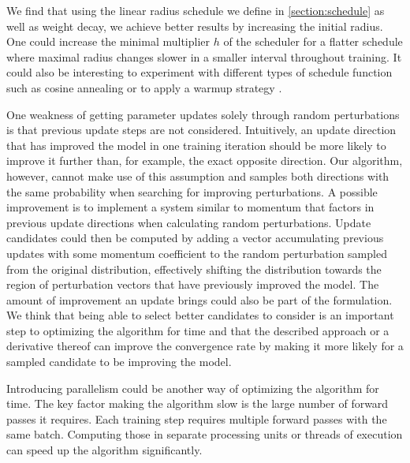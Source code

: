 We find that using the linear radius schedule we define in
\autoref{section:schedule} as well as weight decay, 
we achieve better results 
by increasing the initial radius. 
One could increase the minimal
multiplier $h$ of the scheduler for a flatter schedule where maximal
radius changes slower in a smaller interval 
throughout training. It could also be interesting to 
experiment 
with different types of schedule function such as cosine 
annealing \parencite{cosine} or to apply a warmup 
strategy \parencite{warmup}. 

One weakness of getting parameter updates 
solely through random perturbations is that 
previous update steps are not considered. 
Intuitively, an update direction that 
has improved the model in one training iteration 
should be more likely to improve it further 
than, for example, the exact opposite direction. 
Our algorithm, however, cannot
make use of this assumption and samples both 
directions with the same probability when searching for 
improving perturbations. 
A possible improvement is to implement a
system similar to momentum that factors in previous 
update directions when calculating random 
perturbations. 
Update candidates could then be computed by adding
a vector accumulating previous updates with some 
momentum coefficient to the random perturbation 
sampled from the original distribution, effectively
shifting the distribution towards the region of 
perturbation vectors that have 
previously improved the model. 
The amount of improvement an update brings could 
also be part of the formulation. We think that 
being able to select better candidates to consider
is an important step to optimizing the algorithm for time  
and that the described approach or a derivative thereof
can improve the convergence 
rate by making it more likely 
for a sampled candidate to be improving the model.

Introducing parallelism could be another way of 
optimizing the algorithm for time. The key factor
making the algorithm slow is the large number of forward
passes it requires. Each training step requires multiple
forward passes with the same batch. Computing  
those in separate processing units or 
threads of execution can speed up 
the algorithm significantly. 


  


